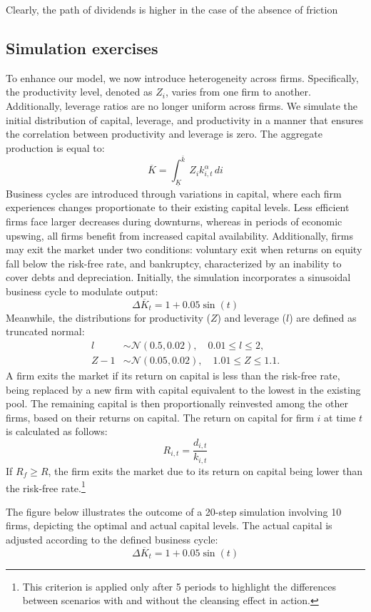 \documentclass[12pt]{article}
\begin{document}
Clearly, the path of dividends is higher  in the case of the absence of friction 
\subsection{Simulation exercises}


To enhance our model, we now introduce heterogeneity across firms. Specifically, the productivity level, denoted as
\(Z_i\), varies from one firm to another. Additionally, leverage ratios are no longer uniform across firms. We simulate
the initial distribution of capital, leverage, and productivity in a manner that ensures the correlation between
productivity and leverage is zero. The aggregate production is equal to:
\[\overline{K} = \int_{\underline{K} }^{\overline{k} }Z_i k_{i,t}^{\alpha}\,di \]
Business cycles are introduced through variations in capital, where each firm experiences changes proportionate to their existing capital levels. Less efficient firms face larger decreases during downturns, whereas in periods of economic upswing, all firms benefit from increased capital availability. Additionally, firms may exit the market under two conditions: voluntary exit when returns on equity fall below the risk-free rate, and bankruptcy, characterized by an inability to cover debts and depreciation. Initially, the simulation incorporates a sinusoidal business cycle to modulate output:
\[
\Delta \overline{K}_t = 1 + 0.05 \sin(t)
\]
Meanwhile, the distributions for productivity (\(Z\)) and leverage (\(l\)) are defined as truncated normal:
\begin{align}
    l &\sim \mathcal{N}(0.5, 0.02), \quad 0.01 \leq l \leq 2, \\
    Z-1 &\sim \mathcal{N}(0.05, 0.02), \quad 1.01 \leq Z \leq 1.1.
\end{align}
A firm exits the market if its return on capital is less than the risk-free rate, being replaced by a new firm with capital equivalent to the lowest in the existing pool. The remaining capital is then proportionally reinvested among the other firms, based on their returns on capital. The return on capital for firm \(i\) at time \(t\) is calculated as follows:
\[
R_{i,t} = \frac{d_{i,t}}{k_{i,t}}
\]
If \(R_f \geq R\), the firm exits the market due to its return on capital being lower than the risk-free rate.\footnote{This criterion is applied only after 5 periods to highlight the differences between scenarios with and without the cleansing effect in action.}

The figure below illustrates the outcome of a 20-step simulation involving 10 firms, depicting the optimal and actual capital levels. The actual capital is adjusted according to the defined business cycle:
\[
\Delta \overline{K}_t = 1 + 0.05 \sin(t)
\]
\end{document}
